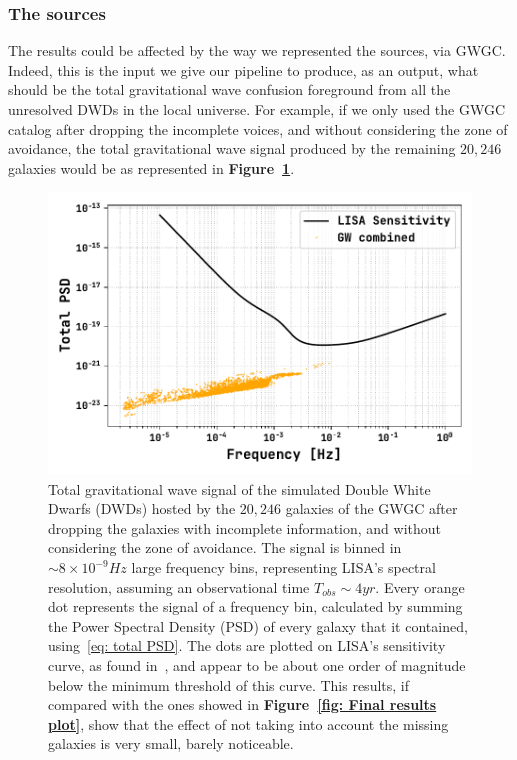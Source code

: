 \subsubsection{The sources}
The results could be affected by the way we represented the sources, via GWGC.
Indeed, this is the input we give our pipeline to produce, as an output, what should be the total gravitational wave confusion foreground from all the unresolved DWDs in the local universe.
For example, if we only used the GWGC catalog after dropping the incomplete voices, and without considering the zone of avoidance, the total gravitational wave signal produced by the remaining $20,246$ galaxies would be as represented in \textbf{Figure~\ref{fig: total signal plot with incomplete catalog}}.
\begin{figure}
    \begin{center}
        \includegraphics[width=\textwidth]{images/Final_results__incomplete_GWGC_plot.pdf}
    \end{center}
    \caption{Total gravitational wave signal of the simulated Double White Dwarfs (DWDs) hosted by the $20,246$ galaxies of the GWGC after dropping the galaxies with incomplete information, and without considering the zone of avoidance. 
    The signal is binned in $\sim 8\times10^{-9}Hz$ large frequency bins, representing LISA's spectral resolution, assuming an observational time $T_{obs}\sim4yr$. 
    Every orange dot represents the signal of a frequency bin, calculated by summing the Power Spectral Density (PSD) of every galaxy that it contained, using~\eqref{eq: total PSD}. 
    The dots are plotted on LISA's sensitivity curve, as found in~\cite{Robson_2019}, and appear to be about one order of magnitude below the minimum threshold of this curve.
    This results, if compared with the ones showed in \textbf{Figure~\ref{fig: Final results plot}}, show that the effect of not taking into account the missing galaxies is very small, barely noticeable. 
    }\label{fig: total signal plot with incomplete catalog}
\end{figure}
